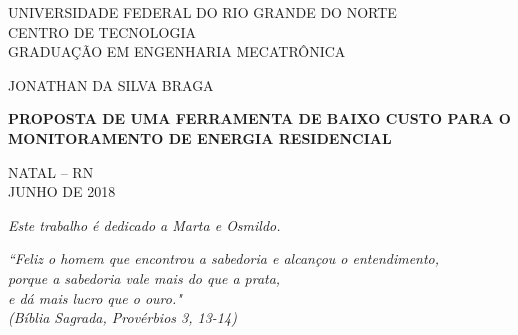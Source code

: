 \documentclass[
	12pt,				%
	oneside,
	a4paper,			%
	chapter=TITLE,
	english,			%
	brazil,				%
	]{abntex2}
\begin{document}

\frenchspacing 

\pretextual

\begin{titlingpage}
	\begin{center}
		UNIVERSIDADE FEDERAL DO RIO GRANDE DO NORTE \\
		CENTRO DE TECNOLOGIA \\
		GRADUAÇÃO EM ENGENHARIA MECATRÔNICA

		\vspace*{1cm}

		JONATHAN DA SILVA BRAGA

		\vspace*{\fill}
		\textbf{PROPOSTA DE UMA FERRAMENTA DE BAIXO CUSTO PARA O MONITORAMENTO DE ENERGIA RESIDENCIAL}
		\vspace*{\fill}

		NATAL -- RN\\
		JUNHO DE 2018
		\vspace*{0.5cm}

	\end{center}
\end{titlingpage}
\imprimirfolhaderosto



\begin{dedicatoria}
	\vspace*{\fill}
	\centering
	\noindent
	\textit{Este trabalho é dedicado a Marta e Osmildo.}
	 \vspace*{\fill}
\end{dedicatoria}



\begin{epigrafe}
	\vspace*{\fill}
	\begin{flushright}
		\textit{``Feliz o homem que encontrou a sabedoria e alcançou o entendimento,\\
			porque a sabedoria vale mais do que a prata, \\
			e dá mais lucro que o ouro."\\
			(Bíblia Sagrada, Provérbios 3, 13-14)}
	\end{flushright}
\end{epigrafe}
\end{document}
